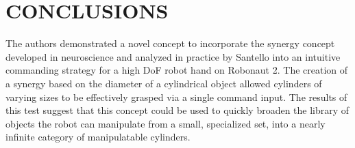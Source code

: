 \documentclass[letterpaper, 10 pt, conference]{ieeeconf}  %
\begin{document}
 
\section{CONCLUSIONS}

The authors demonstrated a novel concept to incorporate the synergy concept developed in neuroscience and analyzed in practice by Santello into an intuitive commanding strategy for a high DoF robot hand on Robonaut 2. The creation of a synergy based on the diameter of a cylindrical object allowed cylinders of varying sizes to be effectively grasped via a single command input. The results of this test suggest that this concept could be used to quickly broaden the library of objects the robot can manipulate from a small, specialized set, into a nearly infinite category of manipulatable cylinders. 

\addtolength{\textheight}{-12cm}   %




\end{document}
